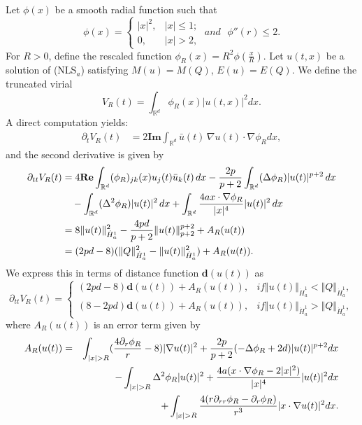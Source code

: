 \documentclass[12pt]{amsart}
\begin{document}
Let $\phi (x)$ be a smooth radial function such that 
\begin{equation*}
\phi (x)=%
\begin{cases}
|x|^{2}, & |x|\leq 1; \\ 
0, & |x|>2,%
\end{cases}%
\;\mathit{and}\text{ }\phi''(r)\leq 2.
\end{equation*}%
For $R>0$, define the rescaled function $\phi _{R}(x)=R^{2}\phi (\frac{x}{R})$. Let $u(t,x)$ be a solution of (NLS$_{a}$) satisfying $M(u)=M(Q)$, $E(u)=E(Q)$. We define
the truncated virial %
\begin{equation*}
V_{R}(t)=\int_{\mathbb{R}^{d}}\phi _{R}(x)|u(t,x)|^{2}dx.
\end{equation*}%
A direct computation yields:
\begin{align*}
\partial _{t}V_{R}(t)& =2\mathbf{Im}\int_{\mathbb{R}^{d}}\bar u(t)%
\,\nabla u(t)\cdot \nabla \phi _{R}dx,
\end{align*}
and the second derivative is given by
\begin{align*}
\partial _{tt}V_{R}(t)& =4\mathbf{Re}\int_{\mathbb{R}^{d}}(\phi
_{R})_{jk}(x)u_{j}(t)\bar{u}_{k}(t)\,dx-\frac{2p}{p+2}\int_{\mathbb{R}%
^{d}}(\Delta \phi _{R})|u(t)|^{p+2}\,dx \\
& \quad -\int_{\mathbb{R}^{d}}(\Delta ^{2}\phi _{R})|u(t)|^{2}\,dx+\int_{%
\mathbb{R}^{d}}\frac{4ax\cdot \nabla \phi _{R}}{|x|^{4}}|u(t)|^{2}\,dx \\
& =8\Vert u(t)\Vert _{\dot{H}_{a}^{1}}^{2}-\frac{4pd}{p+2}\Vert u(t)\Vert
_{p+2}^{p+2}+A_{R}(u(t)) \\
& =(2pd-8)(\Vert Q\Vert _{\dot{H}_{a}^{1}}^{2}-\Vert u(t)\Vert _{\dot{H}%
_{a}^{1}}^{2})+A_{R}(u(t)). 
\end{align*}%
We express this in terms of distance function $\mathbf{d}(u(t))$ as
\begin{equation}
\partial _{tt}V_{R}(t)=%
\begin{cases}
(2pd-8)\mathbf{d}(u(t))+A_{R}(u(t)), & \mathit{if}\Vert u(t)\Vert _{\dot{H}%
_{a}^{1}}<\Vert Q\Vert _{\dot{H}_{a}^{1}},\\ 
(8-2pd)\mathbf{d}(u(t))+A_{R}(u(t)), & \mathit{if}\Vert u(t)\Vert _{\dot{H}%
_{a}^{1}}>\Vert Q\Vert _{\dot{H}_{a}^{1}},%
\end{cases}%
  \label{Vtt}
\end{equation}
where $A_R(u(t))$ is an error term given by 
\begin{eqnarray}
A_{R}(u(t)) &=&\int_{|x|>R}(\frac{4\partial _{r}\phi _{R}}{r}-8)|\nabla
u(t)|^{2}+\frac{2p}{p+2}(-\Delta \phi _{R}+2d)|u(t)|^{p+2}dx\label{458} \\
&&-\int_{|x|>R}\Delta ^{2}\phi _{R}|u(t)|^{2}+\frac{4a(x\cdot \nabla \phi
_{R}-2|x|^{2})}{|x|^{4}}|u(t)|^{2}dx\notag \\
&&+\int_{|x|>R}\frac{4(r\partial _{rr}\phi _{R}-\partial _{r}\phi _{R})}{%
r^{3}}|x\cdot \nabla u(t)|^{2}dx.\notag
\end{eqnarray}%
\end{document}
